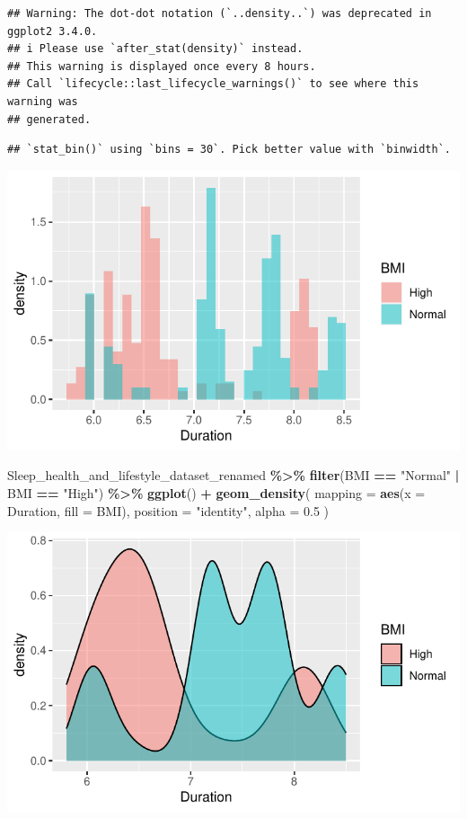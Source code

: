 \documentclass[
  11pt,
]{article}
\newenvironment{Shaded}{\begin{snugshade}}{\end{snugshade}}
\newcommand{\AttributeTok}[1]{\textcolor[rgb]{0.13,0.29,0.53}{#1}}
\newcommand{\FloatTok}[1]{\textcolor[rgb]{0.00,0.00,0.81}{#1}}
\newcommand{\FunctionTok}[1]{\textcolor[rgb]{0.13,0.29,0.53}{\textbf{#1}}}
\newcommand{\NormalTok}[1]{#1}
\newcommand{\SpecialCharTok}[1]{\textcolor[rgb]{0.81,0.36,0.00}{\textbf{#1}}}
\newcommand{\StringTok}[1]{\textcolor[rgb]{0.31,0.60,0.02}{#1}}
\begin{document}
\begin{verbatim}
## Warning: The dot-dot notation (`..density..`) was deprecated in ggplot2 3.4.0.
## i Please use `after_stat(density)` instead.
## This warning is displayed once every 8 hours.
## Call `lifecycle::last_lifecycle_warnings()` to see where this warning was
## generated.
\end{verbatim}

\begin{verbatim}
## `stat_bin()` using `bins = 30`. Pick better value with `binwidth`.
\end{verbatim}

\begin{center}\includegraphics[width=0.7\linewidth]{SleepHelath_files/figure-latex/unnamed-chunk-19-1} \end{center}

\begin{Shaded}
\begin{Highlighting}[]
\NormalTok{Sleep\_health\_and\_lifestyle\_dataset\_renamed }\SpecialCharTok{\%\textgreater{}\%}
  \FunctionTok{filter}\NormalTok{(BMI }\SpecialCharTok{==} \StringTok{"Normal"} \SpecialCharTok{|}\NormalTok{ BMI }\SpecialCharTok{==} \StringTok{"High"}\NormalTok{) }\SpecialCharTok{\%\textgreater{}\%}
  \FunctionTok{ggplot}\NormalTok{() }\SpecialCharTok{+}
  \FunctionTok{geom\_density}\NormalTok{( }
    \AttributeTok{mapping =} \FunctionTok{aes}\NormalTok{(}\AttributeTok{x =}\NormalTok{ Duration, }\AttributeTok{fill =}\NormalTok{ BMI), }
    \AttributeTok{position =} \StringTok{"identity"}\NormalTok{,}
\AttributeTok{alpha =} \FloatTok{0.5}
\NormalTok{  )}
\end{Highlighting}
\end{Shaded}

\begin{center}\includegraphics[width=0.7\linewidth]{SleepHelath_files/figure-latex/unnamed-chunk-20-1} \end{center}
\end{document}
